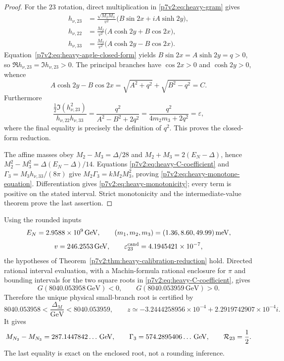 \documentclass[11pt,a4paper]{article}
\begin{document}
\begin{proof}
For the \(23\) rotation, direct multiplication in
\eqref{p7v2:eq:heavy-gram} gives
\[
\begin{aligned}
 h_{\nu,23}
 &=\frac{\sqrt{M_2M_3}}{v^2}
 \bigl(B\sin 2x+iA\sinh 2y\bigr),\\
 h_{\nu,22}
 &=\frac{M_2}{v^2}\bigl(A\cosh 2y+B\cos 2x\bigr),\\
 h_{\nu,33}
 &=\frac{M_3}{v^2}\bigl(A\cosh 2y-B\cos 2x\bigr).
\end{aligned}
\]
Equation~\eqref{p7v2:eq:heavy-angle-closed-form} yields
\(B\sin2x=A\sinh2y=q>0\), so
\(\Re h_{\nu,23}=\Im h_{\nu,23}>0\).  The principal branches have
\(\cos2x>0\) and \(\cosh2y>0\), whence
\[
 A\cosh2y-B\cos2x
 =\sqrt{A^2+q^2}+\sqrt{B^2-q^2}=C.
\]
Furthermore
\[
\frac{\tfrac12\Im(h_{\nu,23}^2)}{h_{\nu,22}h_{\nu,33}}
=\frac{q^2}{A^2-B^2+2q^2}
=\frac{q^2}{4m_2m_3+2q^2}
=\varepsilon,
\]
where the final equality is precisely the definition of \(q^2\).  This proves
the closed-form reduction.

The affine masses obey
\(M_2-M_3=\Delta/28\) and
\(M_2+M_3=2(E_N-\Delta)\), hence
\(M_2^2-M_3^2=\Delta(E_N-\Delta)/14\).  Equations
\eqref{p7v2:eq:heavy-C-coefficient} and
\(\Gamma_3=M_3h_{\nu,33}/(8\pi)\) give
\(M_2\Gamma_3=kM_2M_3^2\), proving
\eqref{p7v2:eq:heavy-monotone-equation}.  Differentiation gives
\eqref{p7v2:eq:heavy-monotonicity}; every term is positive on the stated
interval.  Strict monotonicity and the intermediate-value theorem prove the
last assertion.
\end{proof}

\begin{proposition}
\label{p7v2:prop:heavy-calibration-numerics}
Using the rounded inputs
\[
 E_N=2.9588\times10^9\,{\rm GeV},\qquad
 (m_1,m_2,m_3)=(1.36,8.60,49.99)\,{\rm meV},
\]
\[
 v=246.2553\,{\rm GeV},\qquad
 \varepsilon_{23}^{\rm cand}=4.1945421\times10^{-7},
\]
the hypotheses of Theorem~\ref{p7v2:thm:heavy-calibration-reduction} hold.
Directed rational interval evaluation, with a Machin-formula rational
enclosure for \(\pi\) and bounding intervals for the two square roots in
\eqref{p7v2:eq:heavy-C-coefficient}, gives
\[
 G(8040.053958\,\mathrm{GeV})<0,
 \qquad
 G(8040.053959\,\mathrm{GeV})>0.
\]
Therefore the unique physical small-branch root is certified by
\begin{equation}
\label{p7v2:eq:heavy-calibration-root}
 \boxed{
 8040.053958<\frac{\Delta_M}{\mathrm{GeV}}<8040.053959,
 \qquad
 z\simeq-3.2444258956\times10^{-4}
   +2.2919742907\times10^{-4}i.}
\end{equation}
It gives
\begin{equation}
\label{p7v2:eq:heavy-calibration-output}
 M_{N_2}-M_{N_3}=287.1447842\ldots\,{\rm GeV},
 \qquad
 \Gamma_3=574.2895406\ldots\,{\rm GeV},
 \qquad
 \mathcal R_{23}=\frac12.
\end{equation}
The last equality is exact on the enclosed root, not a rounding inference.
\end{proposition}
\end{document}
